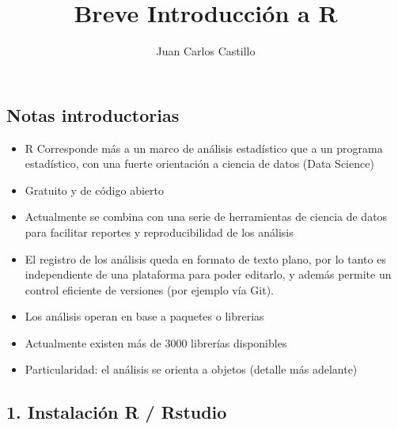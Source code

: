 \documentclass[]{article}
\title{Breve Introducción a R}
\author{Juan Carlos Castillo}
\date{}
\providecommand{\tightlist}{%
  \setlength{\itemsep}{0pt}\setlength{\parskip}{0pt}}
\begin{document}
\maketitle

\hypertarget{notas-introductorias}{%
\subsection{Notas introductorias}\label{notas-introductorias}}

\begin{itemize}
\tightlist
\item
  R Corresponde más a un marco de análisis estadístico que a un programa
  estadístico, con una fuerte orientación a ciencia de datos (Data
  Science)
\item
  Gratuito y de código abierto
\item
  Actualmente se combina con una serie de herramientas de ciencia de
  datos para facilitar reportes y reproducibilidad de los análisis
\item
  El registro de los análisis queda en formato de texto plano, por lo
  tanto es independiente de una plataforma para poder editarlo, y además
  permite un control eficiente de versiones (por ejemplo vía Git).
\item
  Los análisis operan en base a paquetes o librerias
\item
  Actualmente existen más de 3000 librerías disponibles
\item
  Particularidad: el análisis se orienta a objetos (detalle más
  adelante)
\end{itemize}

\hypertarget{instalacion-r-rstudio}{%
\subsection{1. Instalación R / Rstudio}\label{instalacion-r-rstudio}}
\end{document}
